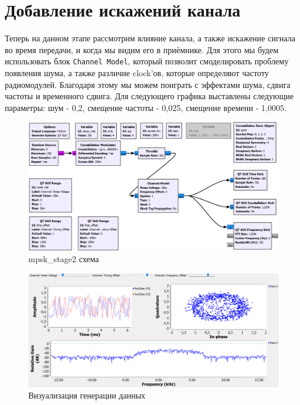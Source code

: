 \documentclass[a4paper,12pt]{report}
\begin{document}
\chapter{Добавление искажений канала}

Теперь на данном этапе рассмотрим влияние канала, а также искажение сигнала во время передачи, и когда мы видим его в приёмнике. Для этого мы будем использовать блок \texttt{Channel Model}, который позволит смоделировать проблему появления шума, а также различие clock'ов, которые определяют частоту радиомодулей. Благодаря этому мы можем поиграть с эффектами шума, сдвига частоты и временного сдвига. Для следующего графика выставлены следующие параметры: шум - 0,2, смещение частоты - 0,025, смещение времени - 1,0005.

\begin{figure}[H]
        \centering
        \includegraphics[width=1.0\textwidth]{5.png}
        \caption{mpsk\_stage2 схема}
        \label{fig:lab12_fig2_1}
\end{figure}

\begin{figure}[H]
        \centering
        \includegraphics[width=1.0\textwidth]{6.png}
        \caption{Визуализация генерации данных}
        \label{fig:lab12_fig2_2}
\end{figure}
\end{document}
